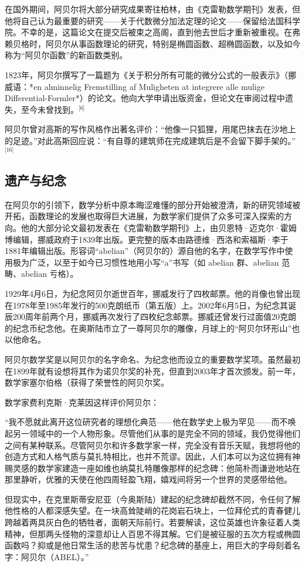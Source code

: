 在国外期间，阿贝尔将大部分研究成果寄往柏林，由《克雷勒数学期刊》发表，但他将自己认为最重要的研究——关于代数微分加法定理的论文——保留给法国科学院。不幸的是，这篇论文在提交后被束之高阁，直到他去世后才重新被重视。在弗赖贝格时，阿贝尔从事函数理论的研究，特别是椭圆函数、超椭圆函数，以及如今称为“阿贝尔函数”的新函数类别。

1823年，阿贝尔撰写了一篇题为《关于积分所有可能的微分公式的一般表示》（挪威语：*en alminnelig Fremstilling af Muligheten at integrere alle mulige Differential-Formler*）的论文。他向大学申请出版资金，但论文在审阅过程中遗失，至今未曾找到。\(^\text{[6]}\)

阿贝尔曾对高斯的写作风格作出著名评价：“他像一只狐狸，用尾巴抹去在沙地上的足迹。”对此高斯回应说：“有自尊的建筑师在完成建筑后是不会留下脚手架的。”\(^\text{[16]}\)
\subsection{遗产与纪念}
在阿贝尔的引领下，数学分析中原本晦涩难懂的部分开始被澄清，新的研究领域被开拓，函数理论的发展也取得巨大进展，为数学家们提供了众多可深入探索的方向。他的大部分论文最初发表在《克雷勒数学期刊》上，由贝恩特·迈克尔·霍姆博编辑，挪威政府于1839年出版。更完整的版本由路德维·西洛和索福斯·李于1881年编辑出版。形容词“abelian”（阿贝尔的）源自他的名字，在数学写作中使用极为广泛，以至于如今已习惯性地用小写“a”书写（如 abelian 群、abelian 范畴、abelian 亏格）。

1929年4月6日，为纪念阿贝尔逝世百年，挪威发行了四枚邮票。他的肖像也曾出现在1978年至1985年发行的500克朗纸币（第五版）上。2002年6月5日，为纪念其诞辰200周年前两个月，挪威再次发行了四枚纪念邮票。挪威还曾发行过面值20克朗的纪念币纪念他。在奥斯陆市立了一尊阿贝尔的雕像，月球上的“阿贝尔环形山”也以他命名。

阿贝尔数学奖是以阿贝尔的名字命名、为纪念他而设立的重要数学奖项。虽然最初在1899年就有设想将其作为诺贝尔奖的补充，但直到2003年才首次颁发。前一年，数学家塞尔伯格（获得了荣誉性的阿贝尔奖。

数学家费利克斯·克莱因这样评价阿贝尔：

“我不愿就此离开这位研究者的理想化典范——他在数学史上极为罕见——而不唤起另一领域中的一个人物形象。尽管他们从事的是完全不同的领域，我仍觉得他们之间有某种联系。尽管阿贝尔和许多数学家一样，完全没有音乐天赋，我想将他的创造方式和人格气质与莫扎特相比，也并不荒谬。因此，人们本可以为这位拥有神赐灵感的数学家建造一座如维也纳莫扎特雕像那样的纪念碑：他简朴而谦逊地站在那里静听，优雅的天使在他四周轻盈飞翔，嬉戏间将另一个世界的灵感带给他。

但现实中，在克里斯蒂安尼亚（今奥斯陆）建起的纪念碑却截然不同，令任何了解他性格的人都深感失望。在一块高耸陡峭的花岗岩石块上，一位拜伦式的青春健儿跨越着两具灰白色的牺牲者，面朝天际前行。若要解读，这位英雄也许象征着人类精神，但那两头怪物的深意却让人百思不得其解。它们是被征服的五次方程或椭圆函数吗？抑或是他日常生活的悲苦与忧患？纪念碑的基座上，用巨大的字母刻着名字：阿贝尔（ABEL）。”
